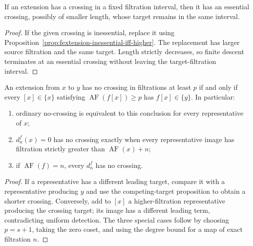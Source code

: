 \begin{lemma}
  \label{lem:crossing-has-essential-crossing}
  \notready
  If an extension has a crossing in a fixed filtration interval, then it has
  an essential crossing, possibly of smaller length, whose target remains in
  the same interval.
\end{lemma}

\begin{proof}
  If the given crossing is inessential, replace it using
  Proposition~\ref{prop:fextension-inessential-iff-higher}.  The replacement
  has larger source filtration and the same target.  Length strictly
  decreases, so finite descent terminates at an essential crossing without
  leaving the target-filtration interval.
\end{proof}

\begin{proposition}
  \label{prop:no-crossing-iff-uniform-detection}
  \notready
  An extension from $x$ to $y$ has no crossing in filtrations at least $p$ if
  and only if every $[x]\in\{x\}$ satisfying
  $\operatorname{AF}(f[x])\ge p$ has $f[x]\in\{y\}$.  In particular:
  \begin{enumerate}
    \item ordinary no-crossing is equivalent to this conclusion for every
      representative of $x$;
    \item $d_n^f(x)=0$ has no crossing exactly when every representative image
      has filtration strictly greater than $\operatorname{AF}(x)+n$;
    \item if $\operatorname{AF}(f)=n$, every $d_n^f$ has no crossing.
  \end{enumerate}
\end{proposition}

\begin{proof}
  If a representative has a different leading target, compare it with a
  representative producing $y$ and use the competing-target proposition to
  obtain a shorter crossing.  Conversely, add to $[x]$ a higher-filtration
  representative producing the crossing target; its image has a different
  leading term, contradicting uniform detection.  The three special cases
  follow by choosing $p=s+1$, taking the zero coset, and using the degree bound
  for a map of exact filtration $n$.
\end{proof}

